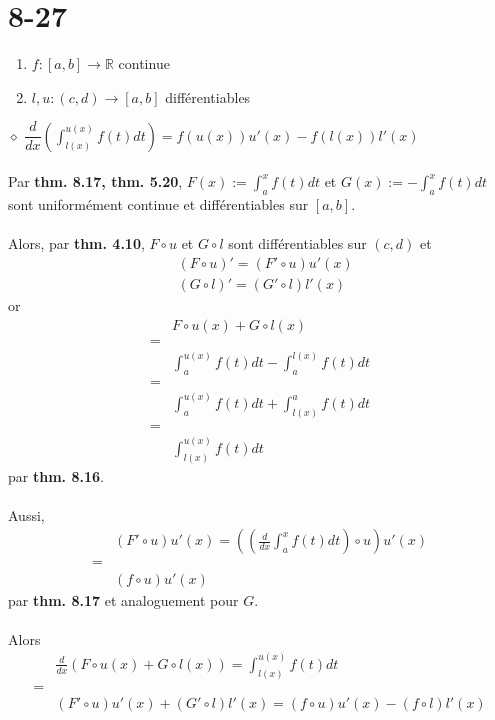\documentclass[a4paper,10pt]{article}
\begin{document}
\section*{8-27}
\begin{enumerate}
 \item $f : [a,b] \rightarrow \mathbb{R}$ continue
 \item $l,u : (c,d) \rightarrow [a,b]$ différentiables
\end{enumerate}
$\diamond$ \textbf{$\dfrac{d}{dx}\left(\int_{l(x)}^{u(x)} f(t) dt \right) = f(u(x))u'(x) - f(l(x))l'(x)$}
\\
\\
Par \textbf{thm. 8.17, thm. 5.20}, $F(x) := \int_a^x f(t)dt$ et $G(x) := -\int_a^x f(t) dt$ sont uniformément continue
et différentiables sur $[a,b]$. 
\\
\\
Alors, par \textbf{thm. 4.10}, $F \circ u$ et $G \circ l$ sont différentiables sur $(c,d)$ et 
\begin{align*}
 & (F \circ u)' = (F' \circ u)u'(x) \\
 & (G \circ l)' = (G' \circ l)l'(x)
\end{align*}
or
\begin{align*}
 & F \circ u (x) + G \circ l (x) \\
 = \\
 & \int_a^{u(x)} f(t) dt - \int_a^{l(x)} f(t) dt \\
 = \\
 & \int_a^{u(x)} f(t) dt + \int_{l(x)}^a f(t) dt \\
 = \\
 & \int_{l(x)}^{u(x)} f(t) dt
\end{align*}
par \textbf{thm. 8.16}.
\\
\\
Aussi, 
\begin{align*}
 & (F' \circ u)u'(x) = ((\frac{d}{dx} \int_a^x f(t)dt) \circ u)u'(x) \\
 = \\
 & (f \circ u)u'(x)
\end{align*}
par \textbf{thm. 8.17} et analoguement pour $G$.
\\
\\
Alors 
\begin{align*}
 & \frac{d}{dx}(F\circ u(x) + G \circ l(x)) = \int_{l(x)}^{u(x)} f(t)dt \\
 = \\
 & (F'\circ u)u'(x)+(G'\circ l)l'(x) = (f \circ u)u'(x) - (f \circ l)l'(x)
\end{align*}
\end{document}
